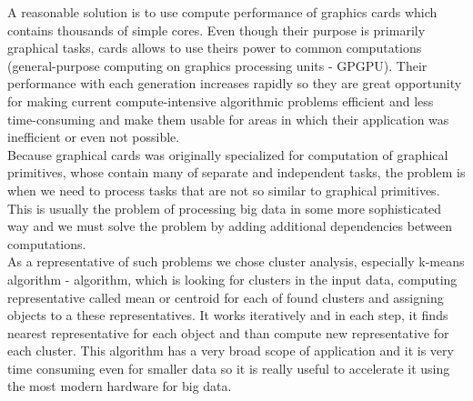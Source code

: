 A reasonable solution is to use compute performance of graphics cards which contains thousands of simple cores. Even though their purpose is primarily graphical tasks, cards allows to use theirs power to common computations (general-purpose computing on graphics processing units - GPGPU). Their performance with each generation increases rapidly so they are great opportunity for making current compute-intensive algorithmic problems efficient and less time-consuming and make them usable for areas in which their application was inefficient or even not possible.\\
Because graphical cards was originally specialized for computation of graphical primitives, whose contain many of separate and independent tasks, the problem is when we need to process tasks that are not so similar to graphical primitives. This is usually the problem of processing big data in some more sophisticated way and we must solve the problem by adding additional dependencies between computations. \\

As a representative of such problems we chose cluster analysis, especially k-means algorithm - algorithm, which is looking for clusters in the input data, computing representative called mean or centroid for each of found clusters and assigning objects to a these representatives. It works iteratively and in each step, it finds nearest representative for each object and than compute new representative for each cluster. This algorithm has a very broad scope of application and it is very time consuming even for smaller data so it is really useful to accelerate it using the most modern hardware for big data.\\

